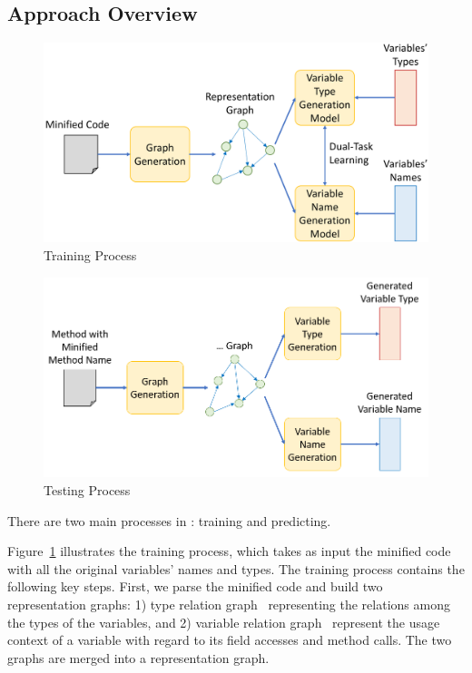 \subsection{Approach Overview}


\begin{figure}[t]
	\begin{center}
		\includegraphics[width=.8\columnwidth]{figures/training-2.png}
		\caption{Training Process}
		\label{training_process}
	\end{center}
\end{figure}

\begin{figure}[t]
	\begin{center}
		\includegraphics[width=.7\columnwidth]{figures/testing.png}
		\caption{Testing Process}
		\label{testing_process}
	\end{center}
\end{figure}

There are two main processes in {\tool}: training and predicting.

Figure~\ref{training_process} illustrates the training process, which
takes as input the minified code with all the original variables'
names and types. The training process contains the following key
steps. First, we parse the minified code and build two representation
graphs: 1) type relation graph~\cite{} representing the relations
among the types of the variables, and 2) variable relation
graph~\cite{icse19} represent the usage context of a variable with
regard to its field accesses and method calls. The two graphs are
merged into a representation graph.



